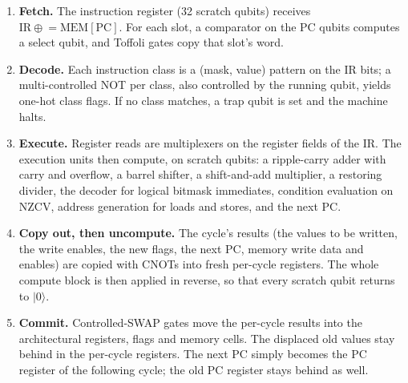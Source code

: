 \documentclass[11pt]{article}
\begin{document}
\begin{enumerate}
  \item \textbf{Fetch.} The instruction register (32 scratch qubits) receives
        $\mathrm{IR} \mathrel{\oplus}= \mathrm{MEM}[\mathrm{PC}]$. For each slot, a comparator on
        the PC qubits computes a select qubit, and Toffoli gates copy that slot's word.
  \item \textbf{Decode.} Each instruction class is a (mask, value) pattern on the IR bits; a
        multi-controlled NOT per class, also controlled by the running qubit, yields one-hot
        class flags. If no class matches, a trap qubit is set and the machine halts.
  \item \textbf{Execute.} Register reads are multiplexers on the register fields of the IR.
        The execution units then compute, on scratch qubits: a ripple-carry adder with
        carry and overflow, a barrel shifter, a shift-and-add multiplier, a restoring
        divider, the decoder for logical bitmask immediates, condition evaluation on NZCV,
        address generation for loads and stores, and the next PC.
  \item \textbf{Copy out, then uncompute.} The cycle's results (the values to be written,
        the write enables, the new flags, the next PC, memory write data and enables) are
        copied with CNOTs into fresh per-cycle registers. The whole compute block is then
        applied in reverse, so that every scratch qubit returns to $|0\rangle$.
  \item \textbf{Commit.} Controlled-SWAP gates move the per-cycle results into the
        architectural registers, flags and memory cells. The displaced old values stay
        behind in the per-cycle registers. The next PC simply becomes the PC register of
        the following cycle; the old PC register stays behind as well.
\end{enumerate}
\end{document}
